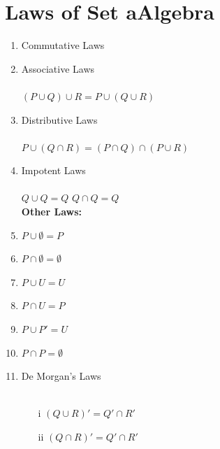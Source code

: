 \documentclass[12pt]{report}
\begin{document}
    \section*{Laws of Set aAlgebra}
        \begin{enumerate}
            \item Commutative Laws \\
            \item Associative Laws \\
                \\
            $(P \cup Q) \cup R = P \cup (Q \cup R)$
            \item Distributive Laws \\
                \\
            $P \cup (Q \cap R) = (P \cap Q) \cap (P \cup R)$        
            \item Impotent Laws \\
                \\
                $Q \cup Q = Q$  $Q \cap Q = Q$\\
                \textbf{Other Laws: } \\
            \item $P \cup \emptyset = P$ \\
            \item $P \cap \emptyset = \emptyset$ \\
            \item $P \cup U = U$ \\
            \item $P \cap U = P$ \\
            \item $P \cup P' = U$\\
            \item $P \cap P = \emptyset$\\
            \item De Morgan's Laws\\
                \\
                \begin{itemize}
                    \item[i] $(Q \cup R)' = Q' \cap R'$
                    \item[ii] $(Q \cap R)' = Q' \cap R'$
                \end{itemize}
        \end{enumerate}
\end{document}
